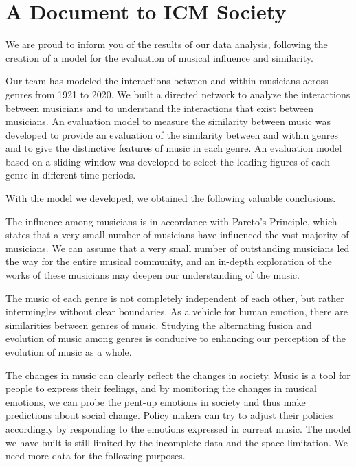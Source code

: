 \documentclass[12pt]{article}  %
\begin{document}
	
	
	\clearpage
	
	\section{A Document to ICM Society}
	
	
	\vspace{-1mm}
	
	
	
	We are proud to inform you of the results of our data analysis, following the creation of a model for the evaluation of musical influence and similarity.
	
	Our team has modeled the interactions between and within musicians across genres from 1921 to 2020. We built a directed network to analyze the interactions between musicians and to understand the interactions that exist between musicians. An evaluation model to measure the similarity between music was developed to provide an evaluation of the similarity between and within genres and to give the distinctive features of music in each genre. An evaluation model based on a sliding window was developed to select the leading figures of each genre in different time periods.
	
	With the model we developed, we obtained the following valuable conclusions.
	
	The influence among musicians is in accordance with Pareto's Principle, which states that a very small number of musicians have influenced the vast majority of musicians. We can assume that a very small number of outstanding musicians led the way for the entire musical community, and an in-depth exploration of the works of these musicians may deepen our understanding of the music.
	
	The music of each genre is not completely independent of each other, but rather intermingles without clear boundaries. As a vehicle for human emotion, there are similarities between genres of music. Studying the alternating fusion and evolution of music among genres is conducive to enhancing our perception of the evolution of music as a whole.
	
	The changes in music can clearly reflect the changes in society. Music is a tool for people to express their feelings, and by monitoring the changes in musical emotions, we can probe the pent-up emotions in society and thus make predictions about social change. Policy makers can try to adjust their policies accordingly by responding to the emotions expressed in current music.
	The model we have built is still limited by the incomplete data and the space limitation. We need more data for the following purposes.
	
\end{document}
